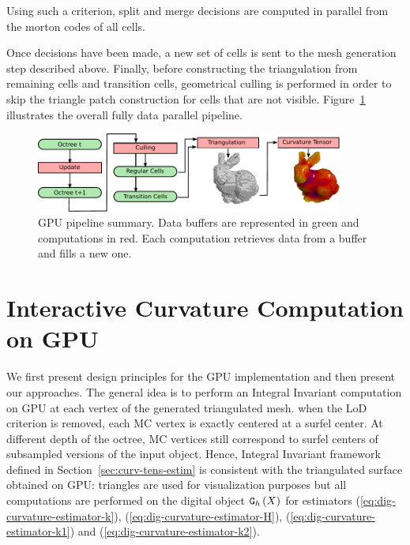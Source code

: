 \documentclass{llncs}
\begin{document}
%
Using such a criterion, split and merge decisions are computed in
parallel from the morton codes of all cells.

Once decisions have been made, a new set of cells is sent to the mesh
generation step described above.
Finally, before
constructing the triangulation from remaining cells and transition
cells, geometrical culling is performed in order to skip the triangle
patch construction for cells that are not visible. Figure~\ref{fig_pipeline}
illustrates the overall fully data parallel pipeline.

\begin{figure}[!htbp]
  \centering
  \includegraphics[width=0.9\textwidth]{figs/pipeline2}
  \caption{GPU pipeline summary. Data buffers are
    represented in green and computations in red. Each computation
    retrieves data from a buffer and fills a new one.}\label{fig_pipeline}
\end{figure}

\section{Interactive Curvature Computation on GPU}
\label{sec:inter-visu-gpu}

We first present design principles for the GPU implementation and then
present our approaches.
The general idea is to perform an Integral Invariant computation on
GPU at each vertex of the generated triangulated mesh.
when the LoD criterion is removed, each MC vertex is exactly centered at
a surfel center. At different depth of the octree, MC vertices still
correspond to surfel centers of subsampled versions of the input
object. Hence, Integral Invariant framework defined in
Section~\ref{sec:curv-tens-estim} is consistent with the triangulated
surface obtained on GPU: triangles are used for visualization purposes
but all computations are performed on the digital object $\mathtt{G}_{h}\left(X\right)$ for
estimators
(\ref{eq:dig-curvature-estimator-k}),
(\ref{eq:dig-curvature-estimator-H}), (\ref{eq:dig-curvature-estimator-k1})
and (\ref{eq:dig-curvature-estimator-k2}).
\end{document}
